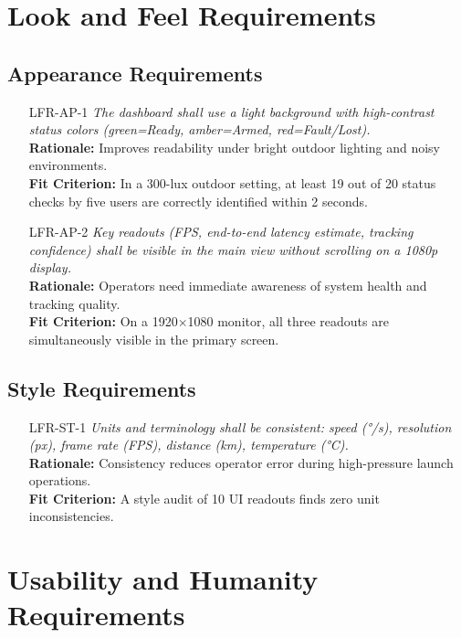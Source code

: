 \documentclass[12pt]{article}
\begin{document}
\section{Look and Feel Requirements}
\subsection{Appearance Requirements}
\begin{itemize}[leftmargin=*]
  \item[LFR-AP-1] \emph{The dashboard shall use a light background with high-contrast status colors (green=Ready, amber=Armed, red=Fault/Lost).}\\
  \textbf{Rationale:} Improves readability under bright outdoor lighting and noisy environments.\\
  \textbf{Fit Criterion:} In a 300-lux outdoor setting, at least 19 out of 20 status checks by five users are correctly identified within 2 seconds.

  \item[LFR-AP-2] \emph{Key readouts (FPS, end-to-end latency estimate, tracking confidence) shall be visible in the main view without scrolling on a 1080p display.}\\
  \textbf{Rationale:} Operators need immediate awareness of system health and tracking quality.\\
  \textbf{Fit Criterion:} On a 1920×1080 monitor, all three readouts are simultaneously visible in the primary screen.
\end{itemize}

\subsection{Style Requirements}
\begin{itemize}[leftmargin=*]
  \item[LFR-ST-1] \emph{Units and terminology shall be consistent: speed (°/s), resolution (px), frame rate (FPS), distance (km), temperature (°C).}\\
  \textbf{Rationale:} Consistency reduces operator error during high-pressure launch operations.\\
  \textbf{Fit Criterion:} A style audit of 10 UI readouts finds zero unit inconsistencies.
\end{itemize}

\section{Usability and Humanity Requirements}
\end{document}
